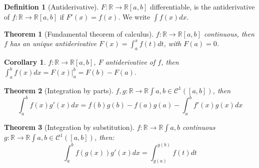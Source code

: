 \documentclass{article}
\newcommand{\fOnR}[1]{#1 : \mathbb{R} \rightarrow \mathbb{R}}
\newcommand{\intcc}[1]{\left[#1\right]}
\theoremstyle{definition}
\newtheorem{definition}{Definition}[section]
\theoremstyle{definition}
\theoremstyle{plain}
\newtheorem{theorem}{Theorem}[section]
\theoremstyle{plain}
\newtheorem{corollary}{Corollary}[theorem]
\theoremstyle{plain}
\theoremstyle{plain}
\theoremstyle{definition}
\theoremstyle{remark}
\theoremstyle{remark}
\theoremstyle{remark}
\theoremstyle{remark}
\newcommand{\C}{\mathcal{C}}
\begin{document}
\begin{definition}[Antiderivative]
  $\fOnR{F}{\intcc{a,b}}$ differentiable, is the antiderivative of $\fOnR{f}{\intcc{a,b}}$ if $F'(x) = f(x)$. We write $\int f(x) dx$.
\end{definition}


\begin{theorem}[Fundamental theorem of calculus]
  $\fOnR{f}{\intcc{a,b}}$ continuous, then $f$ has an unique antiderivative $F(x) = \int_a^x f(t) dt$, with $F(a) = 0$.
\end{theorem}


\begin{corollary}
  $\fOnR{f}{\intcc{a,b}}$, $F$ antiderivative of $f$, then $\int_a^b f(x) dx = F(x) |_a^b = F(b) - F(a)$.
\end{corollary}




\begin{theorem}[Integration by parts]
  $\fOnR{f,g}{\int{a,b}} \in \C^1(\intcc{a,b})$, then
  \[
  \int_a^b f(x) g'(x) dx = f(b)g(b) - f(a)g(a) - \int_a^b f'(x)g(x) dx
  \]
\end{theorem}


\begin{theorem}[Integration by substitution]
  $\fOnR{f}{\int{a,b}}$ continuous $\fOnR{g}{\int{a,b}} \in \C^1(\intcc{a,b})$, then:
  \[
    \int_a^b f(g(x))g'(x) dx = \int_{g(a)}^{g(b)} f(t) dt
  \]
\end{theorem}




\end{document}
